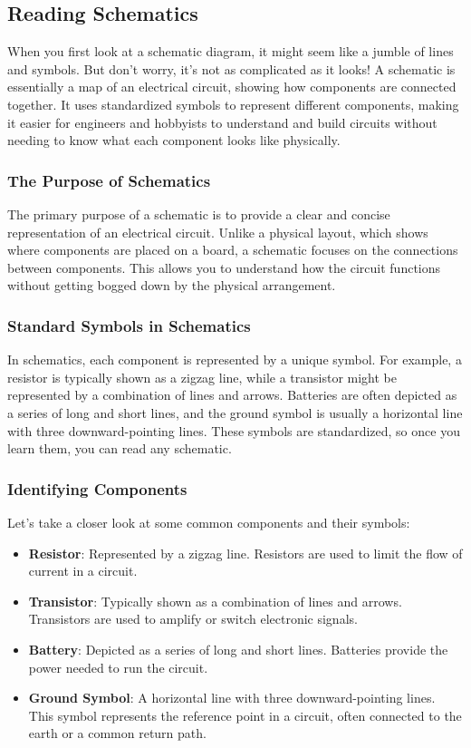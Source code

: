 \subsection{Reading Schematics}
\label{subsec:schem-reading}

When you first look at a schematic diagram, it might seem like a jumble of lines and symbols. But don't worry, it's not as complicated as it looks! A schematic is essentially a map of an electrical circuit, showing how components are connected together. It uses standardized symbols to represent different components, making it easier for engineers and hobbyists to understand and build circuits without needing to know what each component looks like physically.

\subsubsection*{The Purpose of Schematics}
The primary purpose of a schematic is to provide a clear and concise representation of an electrical circuit. Unlike a physical layout, which shows where components are placed on a board, a schematic focuses on the connections between components. This allows you to understand how the circuit functions without getting bogged down by the physical arrangement.

\subsubsection*{Standard Symbols in Schematics}
In schematics, each component is represented by a unique symbol. For example, a resistor is typically shown as a zigzag line, while a transistor might be represented by a combination of lines and arrows. Batteries are often depicted as a series of long and short lines, and the ground symbol is usually a horizontal line with three downward-pointing lines. These symbols are standardized, so once you learn them, you can read any schematic.

\subsubsection*{Identifying Components}
Let's take a closer look at some common components and their symbols:

\begin{itemize}
    \item \textbf{Resistor}: Represented by a zigzag line. Resistors are used to limit the flow of current in a circuit.
    \item \textbf{Transistor}: Typically shown as a combination of lines and arrows. Transistors are used to amplify or switch electronic signals.
    \item \textbf{Battery}: Depicted as a series of long and short lines. Batteries provide the power needed to run the circuit.
    \item \textbf{Ground Symbol}: A horizontal line with three downward-pointing lines. This symbol represents the reference point in a circuit, often connected to the earth or a common return path.
\end{itemize}

